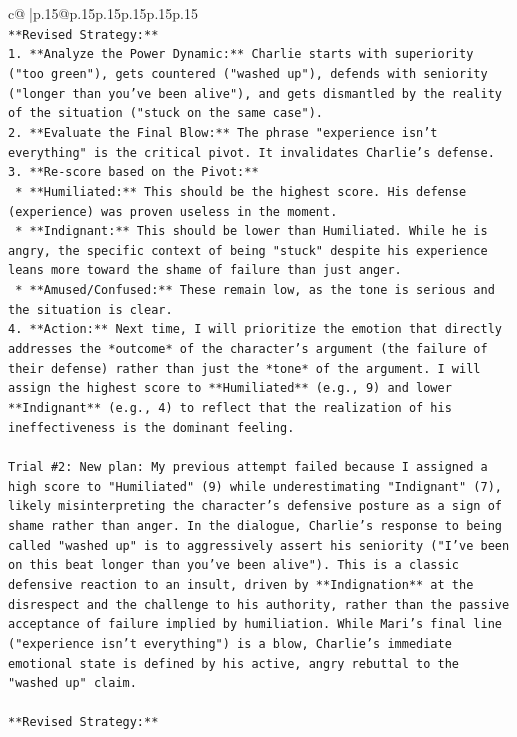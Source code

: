 \documentclass{article}
\begin{document}
{\begin{supertabular}{c@{$\;$}|p{.15\linewidth}@{}p{.15\linewidth}p{.15\linewidth}p{.15\linewidth}p{.15\linewidth}p{.15\linewidth}}
{{{\\ 
\texttt{**Revised Strategy:**} \\
\texttt{1.  **Analyze the Power Dynamic:** Charlie starts with superiority ("too green"), gets countered ("washed up"), defends with seniority ("longer than you've been alive"), and gets dismantled by the reality of the situation ("stuck on the same case").} \\
\texttt{2.  **Evaluate the Final Blow:** The phrase "experience isn't everything" is the critical pivot. It invalidates Charlie's defense.} \\
\texttt{3.  **Re{-}score based on the Pivot:**} \\
\texttt{    *   **Humiliated:** This should be the highest score. His defense (experience) was proven useless in the moment.} \\
\texttt{    *   **Indignant:** This should be lower than Humiliated. While he is angry, the specific context of being "stuck" despite his experience leans more toward the shame of failure than just anger.} \\
\texttt{    *   **Amused/Confused:** These remain low, as the tone is serious and the situation is clear.} \\
\texttt{4.  **Action:** Next time, I will prioritize the emotion that directly addresses the *outcome* of the character's argument (the failure of their defense) rather than just the *tone* of the argument. I will assign the highest score to **Humiliated** (e.g., 9) and lower **Indignant** (e.g., 4) to reflect that the realization of his ineffectiveness is the dominant feeling.} \\
\\ 
\texttt{Trial \#2: New plan: My previous attempt failed because I assigned a high score to "Humiliated" (9) while underestimating "Indignant" (7), likely misinterpreting the character's defensive posture as a sign of shame rather than anger. In the dialogue, Charlie's response to being called "washed up" is to aggressively assert his seniority ("I've been on this beat longer than you've been alive"). This is a classic defensive reaction to an insult, driven by **Indignation** at the disrespect and the challenge to his authority, rather than the passive acceptance of failure implied by humiliation. While Mari's final line ("experience isn't everything") is a blow, Charlie's immediate emotional state is defined by his active, angry rebuttal to the "washed up" claim.} \\
\\ 
\texttt{**Revised Strategy:**} \\
}}}
\end{supertabular}}
\end{document}
